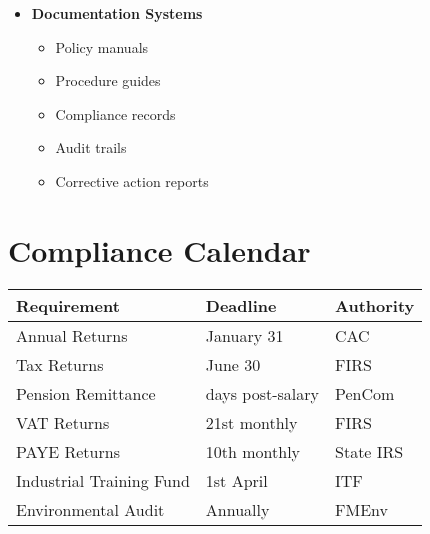 \begin{tcolorbox}[
    colback=white,
    colframe=primarydark,
    title=\textbf{Compliance Management System},
    before skip=1em,
    after skip=1em
]
\begin{itemize}[leftmargin=*,itemsep=0.5em]
        \vspace{0.5em}

        \item \textbf{Documentation Systems}
        \begin{itemize}[itemsep=0.3em]
            \item Policy manuals
            \item Procedure guides
            \item Compliance records
            \item Audit trails
            \item Corrective action reports
        \end{itemize}
    \end{itemize}
\end{tcolorbox}


\section{Compliance Calendar}\label{sec:compliance-calendar}
\vspace{1em}

\begin{tcolorbox}[
    colback=white,
    colframe=primarydark,
    title=\textbf{Key Compliance Deadlines},
    before skip=1em,
    after skip=1em
]
    \begin{center}
        \begin{tabularx}{\textwidth}{>{\raggedright\arraybackslash}X >{\centering\arraybackslash}X >{\raggedright\arraybackslash}X}
            \toprule
            \textbf{Requirement}     & \textbf{Deadline}  & \textbf{Authority} \\
            \midrule
            Annual Returns           & January 31         & CAC                \\
            Tax Returns              & June 30            & FIRS               \\
            Pension Remittance       & 7 days post-salary & PenCom             \\
            VAT Returns              & 21st monthly       & FIRS               \\
            PAYE Returns             & 10th monthly       & State IRS          \\
            Industrial Training Fund & 1st April          & ITF                \\
            Environmental Audit      & Annually           & FMEnv              \\
            \bottomrule
        \end{tabularx}
    \end{center}
\end{tcolorbox}

